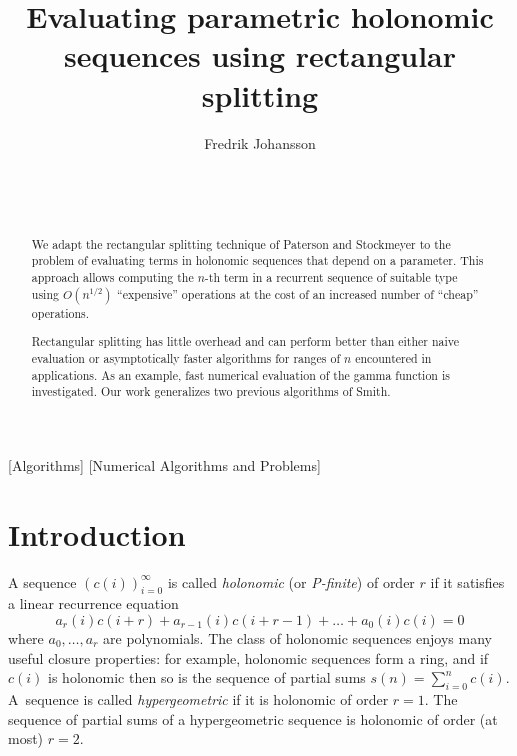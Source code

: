 \documentclass{sig-alternate}
\begin{document}
\title{Evaluating parametric holonomic sequences using rectangular splitting}


\author{\alignauthor Fredrik Johansson\\[\medskipamount]
      \\
      \\
      \\[\smallskipamount]
}

\maketitle

\begin{abstract}
We adapt the rectangular splitting technique of
Paterson and Stockmeyer to the problem of evaluating
terms in holonomic sequences that depend on a parameter.
This approach allows computing the $n$-th term
in a recurrent sequence of suitable type using $O(n^{1/2})$ ``expensive'' operations
at the cost of an increased number of ``cheap'' operations.

Rectangular splitting has little overhead and can perform better
than either naive evaluation or asymptotically faster algorithms
for ranges of $n$ encountered in applications.
As an example,
fast numerical evaluation of the gamma function is investigated.
Our work generalizes two previous algorithms of Smith.
\end{abstract}

[Algorithms]
[Numerical Algorithms and Problems]



\overfullrule=5pt

\section{Introduction}

A sequence $(c(i))_{i=0}^{\infty}$ is called \emph{holonomic}
(or \emph{P-finite}) of order $r$ if it satisfies a linear recurrence equation
\begin{equation}
a_r(i) c(i+r) + a_{r-1}(i) c(i+r-1) + \ldots + a_0(i) c(i) = 0
\label{eq:holeq}
\end{equation}
where $a_0, \ldots, a_r$ are polynomials.
The class of holonomic sequences enjoys many useful closure properties:
for example, holonomic sequences form a ring, and if $c(i)$ is holonomic
then so is the sequence of partial sums $s(n) = \sum_{i=0}^n c(i).$
A~sequence is called \emph{hypergeometric} if it is holonomic of
order $r = 1$. The sequence of partial sums of a hypergeometric sequence
is holonomic of  order (at most) $r = 2$.
\end{document}
